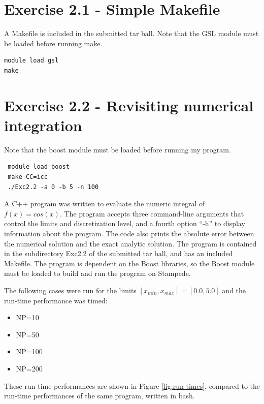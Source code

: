 \documentclass{article}
\begin{document}
 \section{Exercise 2.1 - Simple Makefile}
 
A Makefile is included in the submitted tar ball.  Note that the GSL module must be loaded before running make. 
\begin{verbatim}
module load gsl 
make 
\end{verbatim}
 
 \section{Exercise 2.2 - Revisiting numerical integration}
 
 Note that the boost module must be loaded before running my program. 
 \begin{verbatim}
 module load boost
 make CC=icc
 ./Exc2.2 -a 0 -b 5 -n 100
 \end{verbatim}
 A C++ program was written to evaluate the numeric integral of $f(x)=cos(x)$. The program accepts three command-line arguments that control the limits and discretization level, and a fourth option ``-h'' to display information about the program. The code also prints the absolute error between the numerical solution and the exact analytic solution. The program is contained in the subdirectory Exc2.2 of the submitted tar ball, and has an included Makefile. The program is dependent on the Boost libraries, so the Boost module must be loaded to build and run the program on Stampede. 
 
 The following cases were run for the limits $[x_{min}, x_{max}] = [0.0,5.0]$ and the run-time performance was timed:
 \begin{itemize} \itemsep1pt \parskip0pt 
 \item NP=10
\item NP=50
\item NP=100
\item NP=200
 \end{itemize}
 These run-time performances are shown in Figure \ref{fig:run-times}, compared to the run-time performances of the same program, written in bash. 
\end{document}
